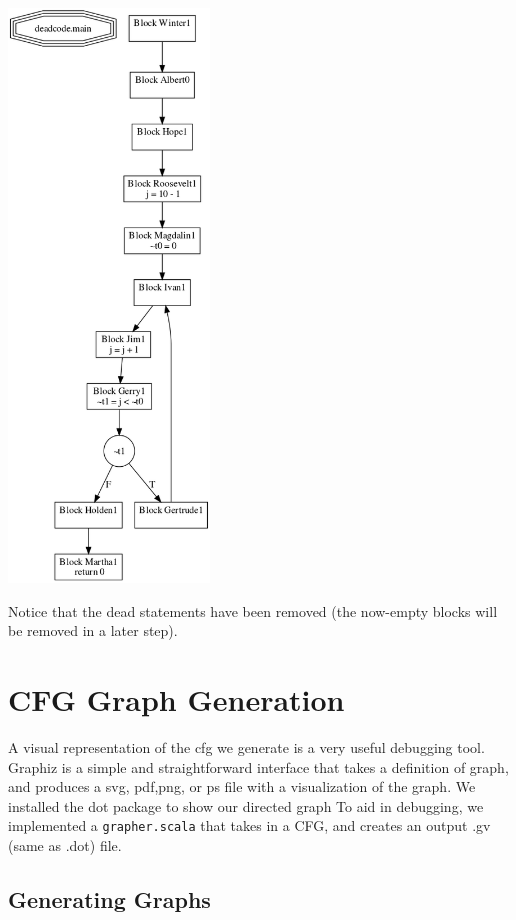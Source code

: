 \documentclass[11pt]{article}
\begin{document}
  \includegraphics[width=0.4\textwidth]{./after_deadcode_example.png}

  Notice that the dead statements have been removed (the now-empty blocks will be removed in a later step).

\section{CFG Graph Generation}
\label{sec-4}

    A visual representation of the cfg we generate is a very useful debugging tool. 
    Graphiz is a simple and straightforward interface that takes a definition of graph, and
    produces a svg, pdf,png, or ps file with a visualization of the graph.
    We installed the dot package to show our directed graph
    To aid in debugging, we implemented a \texttt{grapher.scala} that takes in a CFG,
    and creates an output .gv (same as .dot) file.

\subsection{Generating Graphs}
\label{sec-4.1}
\end{document}
